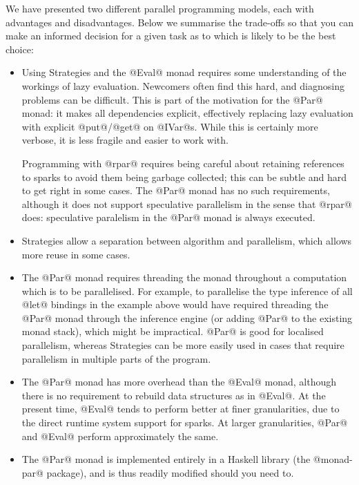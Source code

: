 We have presented two different parallel programming models, each with
advantages and disadvantages.  Below we summarise the trade-offs so
that you can make an informed decision for a given task as to which is
likely to be the best choice:

\begin{itemize}
\item Using Strategies and the @Eval@ monad requires some
  understanding of the workings of lazy evaluation.  Newcomers often
  find this hard, and diagnosing problems can be difficult.  This is
  part of the motivation for the @Par@ monad: it makes all
  dependencies explicit, effectively replacing lazy evaluation with
  explicit @put@/@get@ on @IVar@s.  While this is certainly more
  verbose, it is less fragile and easier to work with.

  Programming with @rpar@ requires being careful about retaining
  references to sparks to avoid them being garbage collected; this can
  be subtle and hard to get right in some cases.  The @Par@ monad has
  no such requirements, although it does not support speculative
  parallelism in the sense that @rpar@ does: speculative paralelism
  in the @Par@ monad is always executed.

\item Strategies allow a separation between algorithm and parallelism,
  which allows more reuse in some cases.

\item The @Par@ monad requires threading the monad throughout a
  computation which is to be parallelised.  For example, to
  parallelise the type inference of all @let@ bindings in the example
  above would have required threading the @Par@ monad through the
  inference engine (or adding @Par@ to the existing monad stack),
  which might be impractical.  @Par@ is good for localised
  parallelism, whereas Strategies can be more easily used in cases
  that require parallelism in multiple parts of the program.

\item The @Par@ monad has more overhead than the @Eval@ monad,
  although there is no requirement to rebuild data structures as in
  @Eval@.  At the present time, @Eval@ tends to perform better at
  finer granularities, due to the direct runtime system support for
  sparks.  At larger granularities, @Par@ and @Eval@ perform
  approximately the same.

\item The @Par@ monad is implemented entirely in a Haskell library
  (the @monad-par@ package), and is thus readily modified should you
  need to.
\end{itemize}



